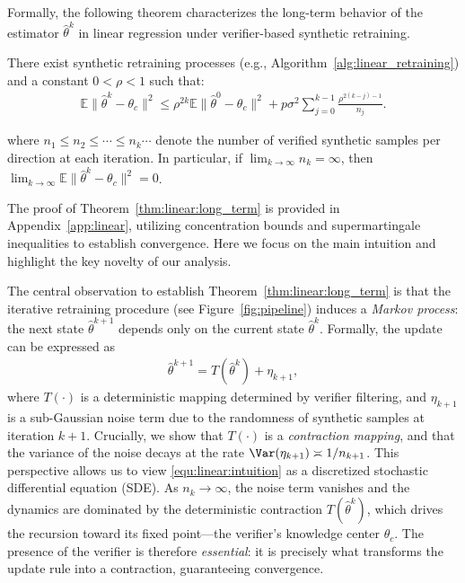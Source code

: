 Formally, the following theorem characterizes the long-term behavior of the estimator $\hat{\theta}^k$ in linear regression under   verifier-based synthetic retraining.

\begin{theorem}\label{thm:linear:long_term}  
There exist synthetic retraining processes (e.g., Algorithm~\ref{alg:linear_retraining}) and a constant $0<\rho < 1$ such that:
\vspace{-3mm}
\begin{align}
\mathbb{E} \|\hat{\theta}^k-\theta_c\|^2 \leq \rho^{2k} \mathbb{E}\|\hat{\theta}^0-\theta_c\|^2 + p\sigma^2\sum_{j=0}^{k-1}\frac{\rho^{2(k-j)-1}}{n_j}. \label{equ:linear:mse_long_term}
\end{align}

where $n_1 \leq n_2 \leq \cdots \leq n_k \cdots$ denote the number of verified synthetic samples per direction at each iteration.
In particular, if $\lim_{k \to \infty} n_k = \infty$, then $\lim_{k \to \infty} \mathbb{E}\|\hat{\theta}^k - \theta_c\|^2 = 0$.
\end{theorem}



The proof of Theorem~\ref{thm:linear:long_term} is provided in Appendix~\ref{app:linear}, utilizing concentration bounds and supermartingale inequalities to establish convergence.
Here we focus on the main intuition and highlight the key novelty of our analysis.  

The central observation to establish Theorem~\ref{thm:linear:long_term} is that the iterative retraining procedure (see Figure~\ref{fig:pipeline}) induces a \emph{Markov process}: the next state $\hat{\theta}^{k+1}$ depends only on the current state $\hat{\theta}^k$.  
Formally, the update can be expressed as
\begin{align}
\hat{\theta}^{k+1} = T(\hat{\theta}^k) + \eta_{k+1}, \label{equ:linear:intuition}
\end{align}
where $T(\cdot)$ is a deterministic mapping determined by verifier filtering, and $\eta_{k+1}$ is a sub-Gaussian noise term due to the randomness of synthetic samples at iteration $k+1$.  
Crucially, we show that $T(\cdot)$ is a \emph{contraction mapping}, and that the variance of the noise decays at the rate $\Var(\eta_{k+1}) \asymp 1/n_{k+1}$. This perspective allows us to view \eqref{equ:linear:intuition} as a discretized stochastic differential equation (SDE).  
As $n_k \to \infty$, the noise term vanishes and the dynamics are dominated by the deterministic contraction $T(\hat{\theta}^k)$, which drives the recursion toward its fixed point---the verifier's knowledge center $\theta_c$.  
The presence of the verifier is therefore \emph{essential}: it is precisely what transforms the update rule into a contraction, guaranteeing convergence.

